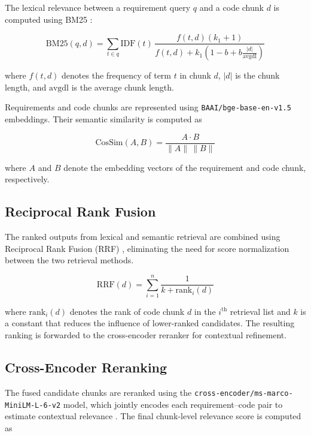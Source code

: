 \documentclass[conference]{IEEEtran}
\begin{document}
The lexical relevance between a requirement query $q$ and a code chunk $d$ is computed using BM25 \cite{ref13}:

\begin{equation}
\mathrm{BM25}(q,d)=
\sum_{t\in q}
\mathrm{IDF}(t)\,
\frac{f(t,d)(k_1+1)}
{f(t,d)+k_1\left(1-b+b\frac{|d|}{\mathrm{avgdl}}\right)}
\label{eq:bm25}
\end{equation}

where $f(t,d)$ denotes the frequency of term $t$ in chunk $d$, $|d|$ is the chunk length, and $\mathrm{avgdl}$ is the average chunk length.

Requirements and code chunks are represented using \texttt{BAAI/bge-base-en-v1.5} embeddings. Their semantic similarity is computed as

\begin{equation}
\mathrm{CosSim}(A,B)=
\frac{A\cdot B}
{\|A\|\,\|B\|}
\label{eq:cosine}
\end{equation}

where $A$ and $B$ denote the embedding vectors of the requirement and code chunk, respectively.

\subsection{Reciprocal Rank Fusion}

The ranked outputs from lexical and semantic retrieval are combined using Reciprocal Rank Fusion (RRF) \cite{ref14}, eliminating the need for score normalization between the two retrieval methods.

\begin{equation}
\mathrm{RRF}(d)=
\sum_{i=1}^{n}
\frac{1}
{k+\mathrm{rank}_i(d)}
\label{eq:rrf}
\end{equation}

where $\mathrm{rank}_i(d)$ denotes the rank of code chunk $d$ in the $i^{\text{th}}$ retrieval list and $k$ is a constant that reduces the influence of lower-ranked candidates. The resulting ranking is forwarded to the cross-encoder reranker for contextual refinement.


\subsection{Cross-Encoder Reranking}

The fused candidate chunks are reranked using the \texttt{cross-encoder/ms-marco-MiniLM-L-6-v2} model, which jointly encodes each requirement--code pair to estimate contextual relevance \cite{ref15}. The final chunk-level relevance score is computed as
\end{document}
